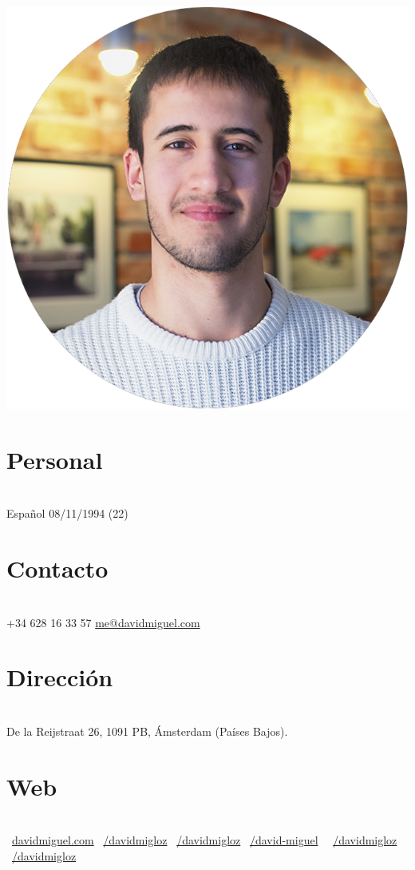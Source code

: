 \documentclass[]{friggeri-cv}
\begin{document}
      

\begin{aside}
  \includegraphics[scale=0.18]{img/profile.png}
  \section{Personal}
    \\[0.3cm] 
    Español
    08/11/1994 (22)
    ~  
  \section{Contacto}
    \\[0.3cm]  
    +34 628 16 33 57
    \href{mailto:me@davidmiguel.com}{me@davidmiguel.com}
    ~  
  \section{Dirección}
    \\[0.3cm]  
    De la Reijstraat 26,
    1091 PB, Ámsterdam
    (Países Bajos).
    ~    
  \section{Web}
    \\[0.3cm]
    \faGlobe\ \href{http://davidmiguel.com}{davidmiguel.com}
    \faLinkedin\ \href{https://www.linkedin.com/in/davidmigloz}{/davidmigloz}
    \faGithub\ \href{https://github.com/davidmigloz/}{/davidmigloz}
    \faStackOverflow\ \href{http://stackoverflow.com/users/6305235/david-miguel}{/david-miguel}    
    \faFacebook\ \ \href{https://www.facebook.com/DavidMigLoz}{/davidmigloz}
    \faTwitter\ \href{https://twitter.com/DavidMigLoz}{/davidmigloz}
    ~

\end{aside}
\end{document}
